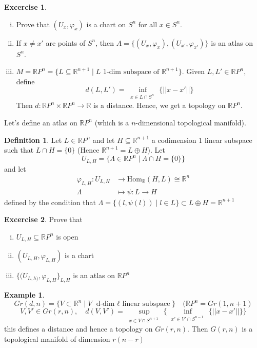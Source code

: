 \documentclass[]{book}
\theoremstyle{definition}
\newtheorem{defin}{Definition}[section]
\theoremstyle{definition}
\theoremstyle{definition}
\theoremstyle{definition}
\theoremstyle{definition}
\theoremstyle{definition}
\theoremstyle{definition}
\theoremstyle{definition}
\theoremstyle{definition}
\newtheorem{ex}{Example}
\theoremstyle{definition}
\newtheorem{exercise}{Excercise}
\theoremstyle{definition}
\newcommand{\R}{\mathbb{R}}
\begin{document}
\begin{exercise}
  \begin{enumerate}[i)]
    \item Prove that $(U_x,\varphi_x)$ is a chart on $S^{n}$ for all $x\in S^{n}$.
    \item If $x\neq x'$ are points of $S^{n}$, then $A=\lbrace (U_x,\varphi_x),(U_{x'},\varphi_{x'})
      \rbrace $ is an atlas on $S^{n}$.
      \item $M=\R P^{n} = \lbrace L\subseteq \R^{n+1}\mid L \text{ 1-dim subspace of } \R^{n+1}
        \rbrace$. Given $L,L'\in \R P^n$, define
        \[
          d(L,L')=\inf_{\substack{ x\in L\cap S^n\
             }} \lbrace || x-x' ||   \rbrace 
        \]
        Then $d:\R P^n \times \R P^n\longrightarrow \R $ is a distance. Hence, we get a topology
        on $\R P^n$.
    \end{enumerate}
\end{exercise}
Let's define an atlas on $\R P^n$ (which is a $n$-dimensional topological manifold).
\begin{defin}
  Let $L\in \R P^n$ and let $H\subseteq \R^{n+1}$ a codimension 1 linear subspace such that
  $L\cap H=\lbrace 0 \rbrace $ (Hence $\R^{n+1}=L \oplus H$). Let
  \[
  U_{L,H}= \lbrace \Lambda  \in \R P^n \mid \Lambda \cap H = \lbrace 0 \rbrace  \rbrace 
  \]
  and let
 \begin{align*}
 \varphi_{L,H}: U_{L,H} &\longrightarrow \text{Hom}_{\R}(H,L)\cong \R^{n} \\
 \Lambda &\longmapsto \psi:L\longrightarrow H  
 \end{align*}
 defined by the condition that $\Lambda=\lbrace (l,\psi(l)) \mid l\in L \rbrace \subset L \oplus H=
 \R^{n+1}$
\end{defin}
\begin{exercise}
  Prove that
  \begin{enumerate}[i)]
    \item $U_{L,H}\subseteq \R P^n$ is open
    \item $(U_{L,H},\varphi_{L,H})$ is a chart
    \item $\lbrace (U_{L,h)},\varphi_{L,H} \rbrace_{L,H}$ is an atlas on $\R P^n$ 
  \end{enumerate}
\end{exercise}
\begin{ex}
   \[
     Gr(d,n)= \lbrace V \subset \R^{n} \mid V \text{ d-dim $\ell$ linear subspace} \rbrace \quad  (\R
     P^n=Gr(1,n+1)
  \]
  \[
    V,V'\in Gr(r,n),\quad d(V,V')= \sup_{\substack{ x\in V\cap S^{n+1}\
         }} \lbrace  \inf_{\substack{ x'\in V'\cap S^{n-1}\
              }} \lbrace || x-x'||   \rbrace 
            \rbrace 
   \] 
   this defines a distance and hence a topology on $Gr(r,n)$. Then $G(r,n)$ is a topological
   manifold of dimension $r(n-r)$
\end{ex}
\end{document}
